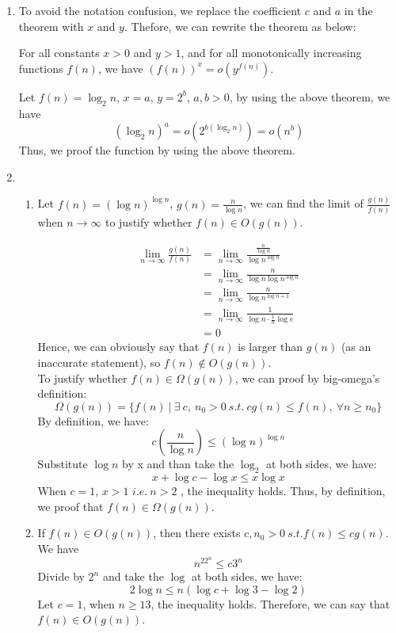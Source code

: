 \documentclass[a4paper,12pt]{article}
\begin{document}
\begin{enumerate}

\item {
To avoid the notation confusion, we replace the coefficient $c$ and $a$ in the theorem with $x$ and $y$. Thefore, we can rewrite the theorem as below:

For all constants $x > 0$ and $y > 1$, and for all monotonically increasing functions $f(n)$, we have $(f(n))^x=o(y^{f(n)})$.

Let $f(n)=\log_2n$, $x = a$, $y = 2^b$, $a,b > 0$, by using the above theorem, we have
\[
(\log_2n)^a = o(2^{b(\log_{2}n)}) = o(n^b)
\]
Thus, we proof the function by using the above theorem.
}

\item{}
\begin{enumerate}
    \item{ %
    Let $f(n) = (\log n)^{\log n}$, $g(n) = \frac{n}{\log n}$, we can find the limit of $\frac{g(n)}{f(n)}$ when $n \rightarrow \infty $ to justify whether $f(n) \in O(g(n))$.
    
\[
\begin{split}
\lim_{n \rightarrow \infty} \frac{g(n)}{f(n)} & = \lim_{n \rightarrow \infty} \frac{\frac{n}{\log n}}{\log n^{\log n}} \\
& = \lim_{n \rightarrow \infty} \frac{n}{\log n \log n^{\log n}} \\
& = \lim_{n \rightarrow \infty} \frac{n}{\log n^{\log n + 1}} \\
& = \lim_{n \rightarrow \infty} \frac{1}{\log n \cdot \frac{1}{n}\log e} \\
& = 0
\end{split}
\]
Hence, we can obviously say that $f(n)$ is larger than $g(n)$ (as an inaccurate statement), so $f(n) \notin O(g(n))$. \\
To justify whether $f(n) \in \Omega (g(n))$, we can proof by big-omega's definition:
\[
\Omega (g(n)) = \{ f(n) \ | \ \exists \ c, \ n_0 > 0 \ s.t. \ cg(n) \leq f(n), \ \forall n \geq n_0 \} 
\]
By definition, we have:
\[
c(\frac{n}{\log n}) \leq (\log n)^{\log n}
\]
Substitute $\log n$ by x and than take the $\log _2$ at both sides, we have:
\[
x + \log c - \log x \leq x \log x
\]
When $c=1$, $x > 1$ $i.e. \ n > 2$ , the inequality holds. Thus, by definition, we proof that $f(n) \in \Omega (g(n))$.
    }
    
    \item{ %
    If $f(n) \in O(g(n))$, then there exists $c, n_0 > 0 \ s.t. f(n)\leq cg(n)$. We have
\[
n^22^n \leq c3^n 
\]
Divide by $2^n$ and take the $\log$ at both sides, we have:
\[
2\log n \leq n(\log c+\log 3-\log 2)
\]
Let $c=1$, when $n \geq 13$, the inequality holds. Therefore, we can say that $f(n) \in O(g(n))$. 
    
}
\end{enumerate}
\end{enumerate}
\end{document}
